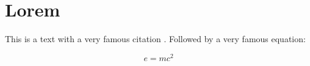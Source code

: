 \chapter{Lorem}
\label{chap:lorem}

This is a text with a very famous citation \cite{wang_approach_2013}.
Followed by a very famous equation:

\begin{equation}
	e = mc^2
\end{equation}
